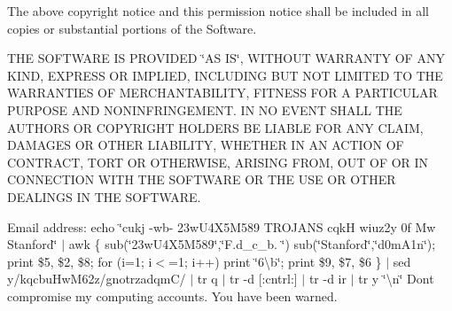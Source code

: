The above copyright notice and this permission notice shall be included in all copies or substantial portions of the Software.

T\+H\+E S\+O\+F\+T\+W\+A\+R\+E I\+S P\+R\+O\+V\+I\+D\+E\+D \char`\"{}\+A\+S I\+S\char`\"{}, W\+I\+T\+H\+O\+U\+T W\+A\+R\+R\+A\+N\+T\+Y O\+F A\+N\+Y K\+I\+N\+D, E\+X\+P\+R\+E\+S\+S O\+R I\+M\+P\+L\+I\+E\+D, I\+N\+C\+L\+U\+D\+I\+N\+G B\+U\+T N\+O\+T L\+I\+M\+I\+T\+E\+D T\+O T\+H\+E W\+A\+R\+R\+A\+N\+T\+I\+E\+S O\+F M\+E\+R\+C\+H\+A\+N\+T\+A\+B\+I\+L\+I\+T\+Y, F\+I\+T\+N\+E\+S\+S F\+O\+R A P\+A\+R\+T\+I\+C\+U\+L\+A\+R P\+U\+R\+P\+O\+S\+E A\+N\+D N\+O\+N\+I\+N\+F\+R\+I\+N\+G\+E\+M\+E\+N\+T. I\+N N\+O E\+V\+E\+N\+T S\+H\+A\+L\+L T\+H\+E A\+U\+T\+H\+O\+R\+S O\+R C\+O\+P\+Y\+R\+I\+G\+H\+T H\+O\+L\+D\+E\+R\+S B\+E L\+I\+A\+B\+L\+E F\+O\+R A\+N\+Y C\+L\+A\+I\+M, D\+A\+M\+A\+G\+E\+S O\+R O\+T\+H\+E\+R L\+I\+A\+B\+I\+L\+I\+T\+Y, W\+H\+E\+T\+H\+E\+R I\+N A\+N A\+C\+T\+I\+O\+N O\+F C\+O\+N\+T\+R\+A\+C\+T, T\+O\+R\+T O\+R O\+T\+H\+E\+R\+W\+I\+S\+E, A\+R\+I\+S\+I\+N\+G F\+R\+O\+M, O\+U\+T O\+F O\+R I\+N C\+O\+N\+N\+E\+C\+T\+I\+O\+N W\+I\+T\+H T\+H\+E S\+O\+F\+T\+W\+A\+R\+E O\+R T\+H\+E U\+S\+E O\+R O\+T\+H\+E\+R D\+E\+A\+L\+I\+N\+G\+S I\+N T\+H\+E S\+O\+F\+T\+W\+A\+R\+E.

Email address\+: echo \char`\"{}cukj -\/wb-\/ 23w\+U4\+X5\+M589 T\+R\+O\+J\+A\+N\+S cqk\+H wiuz2y 0f Mw Stanford\char`\"{} $\vert$ awk \textquotesingle{}\{ sub(\char`\"{}23w\+U4\+X5\+M589\char`\"{},\char`\"{}\+F.\+d\+\_\+c\+\_\+b. \char`\"{}) sub(\char`\"{}\+Stanford\char`\"{},\char`\"{}d0m\+A1n\char`\"{}); print \$5, \$2, \$8; for (i=1; i$<$=1; i++) print \char`\"{}6\textbackslash{}b\char`\"{}; print \$9, \$7, \$6 \}\textquotesingle{} $\vert$ sed y/kqcbu\+Hw\+M62z/gnotrzadqm\+C/ $\vert$ tr \textquotesingle{}q\textquotesingle{} \textquotesingle{} \textquotesingle{} $\vert$ tr -\/d \mbox{[}\+:cntrl\+:\mbox{]} $\vert$ tr -\/d \textquotesingle{}ir\textquotesingle{} $\vert$ tr y \char`\"{}\textbackslash{}n\char`\"{} Don\textquotesingle{}t compromise my computing accounts. You have been warned. 